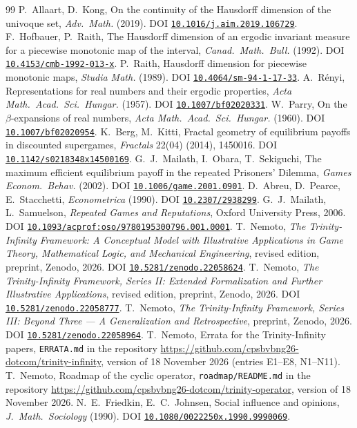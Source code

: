 \documentclass[11pt]{amsart}
\theoremstyle{remark}
\providecommand{\doi}[1]{DOI \href{https://doi.org/#1}{\nolinkurl{#1}}}
\begin{document}
\begin{thebibliography}{99}
 P.~Allaart, D.~Kong, On the continuity of the Hausdorff dimension of the univoque set, \emph{Adv.\ Math.} (2019). \doi{10.1016/j.aim.2019.106729}.
 F.~Hofbauer, P.~Raith, The Hausdorff dimension of an ergodic invariant measure for a piecewise monotonic map of the interval, \emph{Canad.\ Math.\ Bull.} (1992). \doi{10.4153/cmb-1992-013-x}.
 P.~Raith, Hausdorff dimension for piecewise monotonic maps, \emph{Studia Math.} (1989). \doi{10.4064/sm-94-1-17-33}.
 A.~R\'enyi, Representations for real numbers and their ergodic properties, \emph{Acta Math.\ Acad.\ Sci.\ Hungar.} (1957). \doi{10.1007/bf02020331}.
 W.~Parry, On the $\beta$-expansions of real numbers, \emph{Acta Math.\ Acad.\ Sci.\ Hungar.} (1960). \doi{10.1007/bf02020954}.
 K.~Berg, M.~Kitti, Fractal geometry of equilibrium payoffs in discounted supergames, \emph{Fractals} 22(04) (2014), 1450016. \doi{10.1142/s0218348x14500169}.
 G.~J.~Mailath, I.~Obara, T.~Sekiguchi, The maximum efficient equilibrium payoff in the repeated Prisoners' Dilemma, \emph{Games Econom.\ Behav.} (2002). \doi{10.1006/game.2001.0901}.
 D.~Abreu, D.~Pearce, E.~Stacchetti, \emph{Econometrica} (1990). \doi{10.2307/2938299}.
 G.~J.~Mailath, L.~Samuelson, \emph{Repeated Games and Reputations}, Oxford University Press, 2006. \doi{10.1093/acprof:oso/9780195300796.001.0001}.
 T.~Nemoto, \emph{The Trinity-Infinity Framework: A Conceptual Model with Illustrative Applications in Game Theory, Mathematical Logic, and Mechanical Engineering}, revised edition, preprint, Zenodo, 2026. \doi{10.5281/zenodo.22058624}.
 T.~Nemoto, \emph{The Trinity-Infinity Framework, Series II: Extended Formalization and Further Illustrative Applications}, revised edition, preprint, Zenodo, 2026. \doi{10.5281/zenodo.22058777}.
 T.~Nemoto, \emph{The Trinity-Infinity Framework, Series III: Beyond Three --- A Generalization and Retrospective}, preprint, Zenodo, 2026. \doi{10.5281/zenodo.22058964}.
 T.~Nemoto, Errata for the Trinity-Infinity papers, \texttt{ERRATA.md} in the repository \url{https://github.com/cpsbvbng26-dotcom/trinity-infinity}, version of 18 November 2026 (entries E1--E8, N1--N11).
 T.~Nemoto, Roadmap of the cyclic operator, \texttt{roadmap/README.md} in the repository \url{https://github.com/cpsbvbng26-dotcom/trinity-operator}, version of 18 November 2026.
 N.~E.~Friedkin, E.~C.~Johnsen, Social influence and opinions, \emph{J.\ Math.\ Sociology} (1990). \doi{10.1080/0022250x.1990.9990069}.

\end{thebibliography}
\end{document}
